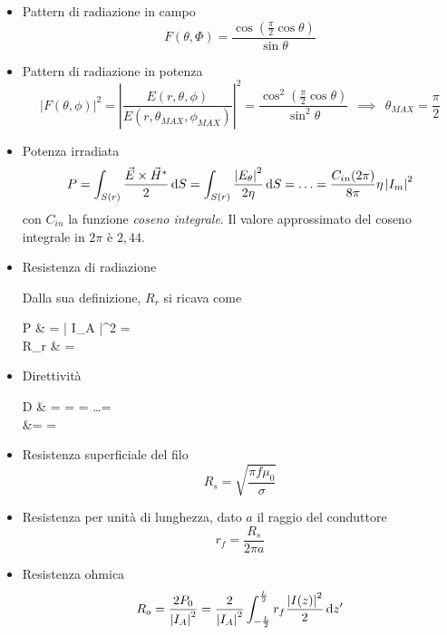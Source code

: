 \begin{itemize}
	\item Pattern di radiazione in campo
	\begin{equation}
		F(\theta, \Phi) = \frac{\cos \left(\frac{\pi}{2} \cos \theta \right)}{\sin \theta}
	\end{equation}

	\item Pattern di radiazione in potenza
	\begin{equation}
		\left | F(\theta, \phi) \right |^2 = \left | \frac{E(r, \theta, \phi)}{E(r, \theta_{MAX}, \phi_{MAX})} \right |^2 = \frac{\cos^2 \left(\frac{\pi}{2} \cos \theta \right)}{\sin^2 \theta}
		~~ \implies ~~
		\theta_{MAX} = \frac{\pi}{2}
	\end{equation}

	\item Potenza irradiata
	\begin{equation}
		P
		= \int_{S(r)} \frac{\vec{E} \times \vec{H}^*}{2} \mathop{}\!\mathrm{d} S
		= \int_{S(r)} \frac{\left | E_{\theta} \right |^2}{2 \eta} \mathop{}\!\mathrm{d} S
		= \ldots = \frac{C_{in} (2 \pi)}{8 \pi} \eta \left | I_m \right |^2
	\end{equation}
	con $C_{in}$ la funzione \emph{coseno integrale}.
	Il valore approssimato del coseno integrale in $2\pi$ è $2,44$.

	\item Resistenza di radiazione

	Dalla sua definizione, $R_r$ si ricava come
	\begin{esp*}
		P
		& =  \eta \left | I_A \right |^2
		=  \\
		R_r
		& =  \eta {} \Omega
	\end{esp*}

	\item Direttività
	\begin{esp}
		D
		& = 
		= 
		= \ldots = \\
		&=  =  
	\end{esp}

	\item Resistenza superficiale del filo
	\begin{equation}
		R_s = \sqrt{\frac{\pi f \mu_0}{\sigma}}
	\end{equation}

	\item Resistenza per unità di lunghezza, dato $a$ il raggio del conduttore
	\begin{equation}
		r_f = \frac{R_s}{2\pi a}
	\end{equation}

	\item Resistenza ohmica
	\begin{equation}
		R_o
		= \frac{2 P_0}{\left |I_A \right |^{2}}
		= \frac{2}{\left |I_A \right |^{2}} \int_{-\frac{L}{2}}^{\frac{L}{2}} r_f \frac{\left |I(z) \right |^{2}}{2} \mathop{}\!\mathrm{d} z^\prime
	\end{equation}
\end{itemize}

